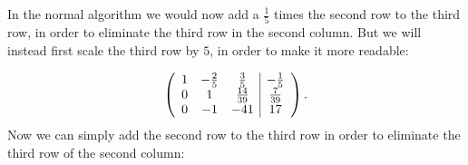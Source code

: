 \documentclass[10pt]{article}
\begin{document}
\begin{solution}[]
In the normal algorithm we would now add a \(\frac{1}{5}\) times the second row
to the third row, in order to eliminate the third row in the second
column. But we will instead first scale the third row by \(5\), in order
to make it more readable:

\begin{align*}
\left( \begin{array}{c c c | c}
1  &  -\frac{2}{5}  &  \frac{3}{5}  &  -\frac{1}{5} \\
0  &  1  &  \frac{14}{39}  &  \frac{7}{39} \\
0  &  -1 &  -41 &  17
\end{array} \right)
.
\end{align*}
Now we can simply add the second row to the third row in order to eliminate
the third row of the second column:


\end{solution}
\end{document}

